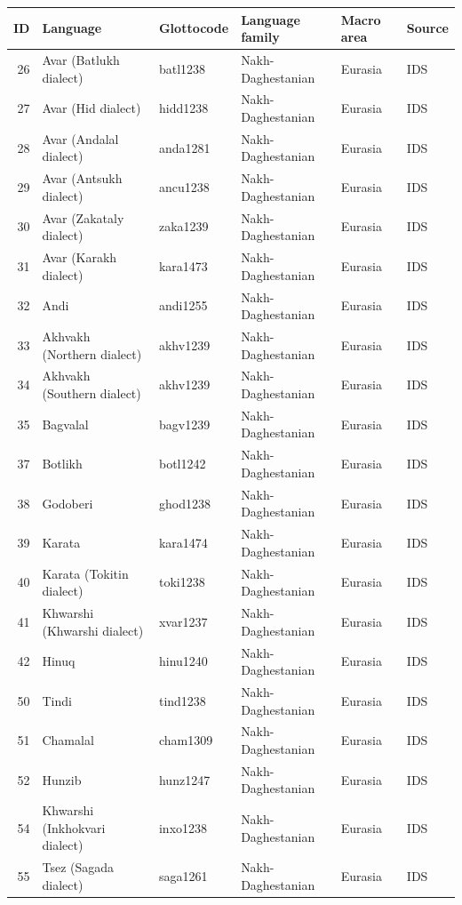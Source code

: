 \begin{table}[ht]
\centering
\begin{tabular}{rlllll}
  \hline
ID & Language & Glottocode & Language family & Macro area & Source \\ 
  \hline
26 & Avar (Batlukh dialect) & batl1238 & Nakh-Daghestanian & Eurasia & IDS \\ 
  27 & Avar (Hid dialect) & hidd1238 & Nakh-Daghestanian & Eurasia & IDS \\ 
  28 & Avar (Andalal dialect) & anda1281 & Nakh-Daghestanian & Eurasia & IDS \\ 
  29 & Avar (Antsukh dialect) & ancu1238 & Nakh-Daghestanian & Eurasia & IDS \\ 
  30 & Avar (Zakataly dialect) & zaka1239 & Nakh-Daghestanian & Eurasia & IDS \\ 
  31 & Avar (Karakh dialect) & kara1473 & Nakh-Daghestanian & Eurasia & IDS \\ 
  32 & Andi & andi1255 & Nakh-Daghestanian & Eurasia & IDS \\ 
  33 & Akhvakh (Northern dialect) & akhv1239 & Nakh-Daghestanian & Eurasia & IDS \\ 
  34 & Akhvakh (Southern dialect) & akhv1239 & Nakh-Daghestanian & Eurasia & IDS \\ 
  35 & Bagvalal & bagv1239 & Nakh-Daghestanian & Eurasia & IDS \\ 
  37 & Botlikh & botl1242 & Nakh-Daghestanian & Eurasia & IDS \\ 
  38 & Godoberi & ghod1238 & Nakh-Daghestanian & Eurasia & IDS \\ 
  39 & Karata & kara1474 & Nakh-Daghestanian & Eurasia & IDS \\ 
  40 & Karata (Tokitin dialect) & toki1238 & Nakh-Daghestanian & Eurasia & IDS \\ 
  41 & Khwarshi (Khwarshi dialect) & xvar1237 & Nakh-Daghestanian & Eurasia & IDS \\ 
  42 & Hinuq & hinu1240 & Nakh-Daghestanian & Eurasia & IDS \\ 
  50 & Tindi & tind1238 & Nakh-Daghestanian & Eurasia & IDS \\ 
  51 & Chamalal & cham1309 & Nakh-Daghestanian & Eurasia & IDS \\ 
  52 & Hunzib & hunz1247 & Nakh-Daghestanian & Eurasia & IDS \\ 
  54 & Khwarshi (Inkhokvari dialect) & inxo1238 & Nakh-Daghestanian & Eurasia & IDS \\ 
  55 & Tsez (Sagada dialect) & saga1261 & Nakh-Daghestanian & Eurasia & IDS \\ 

\end{tabular}
\end{table}
